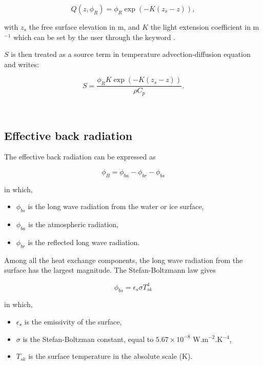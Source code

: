 \begin{equation}
Q(z,\phi_R) = \phi_R \exp\left(-K(z_{s}-z) \right),
\end{equation}

with $z_{s}$ the free surface elevation in m, and $K$ the light extension coefficient in m$^{-1}$ which can be set by the user through the keyword .

$S$ is then treated as a source term in temperature advection-diffusion equation and writes:

\begin{equation}
  S=\dfrac{\phi_R K \exp\left(-K(z_{s}-z) \right)}{\rho C_p}.
\end{equation}

~\newline
\subsection{Effective back radiation}

The effective back radiation can be expressed as

\begin{equation} \label{eq:phib}
   \phi_B=\phi_{ba}-\phi_{br}-\phi_{bs}
\end{equation}

in which,
\begin{itemize}
   \item $\phi_{bs}$ is the long wave radiation from the water or ice surface,
   \item $\phi_{ba}$ is the atmospheric radiation,
   \item $\phi_{br}$ is the reflected long wave radiation.
\end{itemize}

Among all the heat exchange components, the long wave radiation from the surface has the largest magnitude. The Stefan-Boltzmann law gives

\begin{equation} \label{eq:phibs}
   \phi_{bs}=\epsilon_s\sigma T_{sk}^4
\end{equation}

in which,
\begin{itemize}
	\item $\epsilon_s$ is the emissivity of the surface,
    \item $\sigma$ is the Stefan-Boltzman constant, equal to $5.67\times10^{-8}$ W.m$^{-2}$.K$^{-4}$,
	\item $T_{sk}$ is the surface temperature in the absolute scale (K).
\end{itemize}

